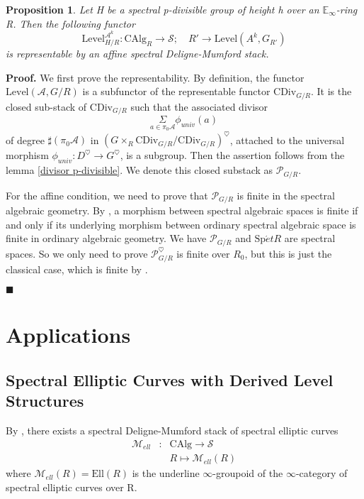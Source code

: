 \documentclass[12pt]{article}
\newtheorem{proposition}[theorem]{Proposition}
\theoremstyle{thry}
\renewenvironment{proof}
{\par \noindent \textbf{Proof.}}
{ \par \hfill $\blacksquare$ \quad \par }
\def  \CAlg     {\mathrm{CAlg}}
\def  \CDiv     {\mathrm{CDiv}}
\def  \Ell      {\mathrm{Ell}}
\def  \Level    {\mathrm{Level}}
\def  \Spet     {\mathrm{Sp}\acute{e}t}
\def  \ca       {\mathcal{A}}
\def  \cm       {\mathcal{M}}
\def  \cp       {\mathcal{P}}
\def  \cs       {\mathcal{S}}
\def  \be       {\mathbb{E}}
\begin{document}
\begin{proposition} \label{relative rep of p-divisible group}
	Let H be a spectral p-divisible group  of height h over an $\be_{\infty}$-ring R. Then the following functor
	$$
	\Level^{\ca^k}_{H/R}:\CAlg_R \to \cs; \quad    R' \to \Level(A^k, G_{R'})
	$$
	is representable by  an affine spectral Deligne-Mumford stack. 
\end{proposition}

\begin{proof}
	  We first prove the representability. By definition, the functor $\Level(\ca, G/R)$ is a subfunctor of the representable functor $\CDiv_{G/R}$. 
	  It is the closed sub-stack of $\CDiv_{G/R}$ such that the associated divisor
	  $$
	  \underset{a \in \pi_0 \ca}{\Sigma} \phi_{univ}(a)
	  $$
	   of degree $ \sharp  (\pi_0 \ca)$ in $ (G \times_R \CDiv_{G/R}/ \CDiv_{G/R})^{\heartsuit}$, attached to the universal morphism $\phi_{univ}:  D^{\heartsuit} \to G^{\heartsuit}$, is a subgroup. Then the assertion follows from the  lemma \ref{divisor p-divisible}. We denote this closed substack as $\cp_{G/R}$.
	  
	  For the affine condition, we need to prove that $\cp_{G/R}$ is finite in the spectral algebraic geometry. By \cite[Remark 5.2.0.2]{lu-SAG}, a morphism between spectral algebraic spaces is finite if and only if  its underlying morphism between ordinary spectral algebraic space is finite in ordinary algebraic geometry. We have $\cp_{G/R}$  and $\Spet R$ are spectral spaces.  So we only need to prove   $\cp_{G/R}^{\heartsuit}$ is finite over $R_0$, but this is just the classical case, which is finite by \cite[Corollary 1.6.3]{katz1985arithmetic}.
\end{proof}



\section{Applications}
\subsection{Spectral Elliptic Curves with Derived Level Structures}

By \cite[Theorem 2.4.1]{lu-EC2}, there exists a spectral Deligne-Mumford stack of spectral elliptic curves
\begin{eqnarray*}
	\cm_{ell} & : &\CAlg \to    \cs  \\	                       
	&  & R  \longmapsto     \cm_{ell}(R)   
\end{eqnarray*}
where $\cm_{ell}(R) = \Ell(R)$ is the underline $\infty$-groupoid  of the $\infty$-category of spectral elliptic curves over R.
\end{document}
